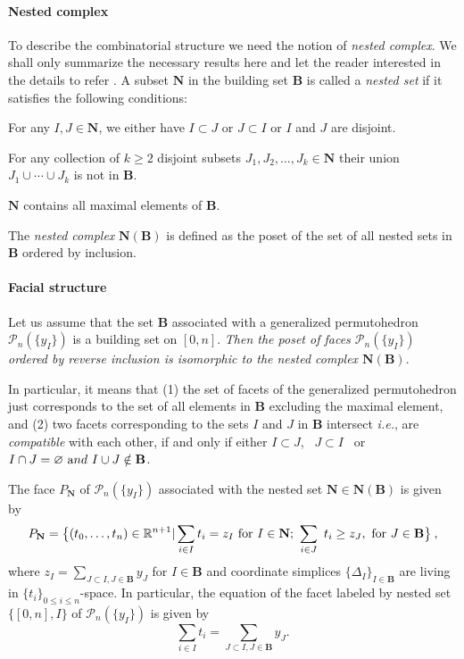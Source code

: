 \documentclass[hidelinks,12pt]{article}
\newcommand{\bea}[1]{\begin{eqnarray}\label{#1} }
\newcommand{\eea}{\end{eqnarray}}
\def\bea{\begin{eqnarray}}
\def\eea{\end{eqnarray}}
\begin{document}
\paragraph{Nested complex} To describe the combinatorial structure we need the notion of {\it nested complex}. We shall only summarize the necessary results here and let the reader interested in the details to refer \cite{Postnikov:2005,Postnikov:2006}.
A subset ${\mathbf N}$ in the building set ${\mathbf B}$ is called a {\it nested set} if it satisfies the following conditions:
\begin{compactenum}[\quad (1)]
    \item For any $I,J \in {\mathbf N}$, we either have $I \subset J$ or $J\subset I$ or $I$ and $J$ are disjoint.
    \item For any collection of $k \geq 2$ disjoint subsets $J_1,J_2,\dots, J_k \in \mathbf N$ their union $J_1 \cup \cdots \cup J_k$ is not in $\mathbf B$.
    \item ${\mathbf N}$ contains all maximal elements of $\mathbf B$.
\end{compactenum}
The {\it nested complex} ${\mathbf N}({\mathbf B})$ is defined as the poset of the set of all nested sets in ${\mathbf B}$ ordered by inclusion.
\paragraph*{Facial structure} 
Let us assume that the set ${\mathbf B}$ associated with a generalized permutohedron ${\mathscr P_n(\{y_I\})}$ is a building set on $[0,n]$. \emph{Then the poset of faces ${\mathscr P_n(\{y_I\})}$ ordered by reverse inclusion is isomorphic to the nested complex ${\mathbf N}({\mathbf B})$}. 

In particular, it means that (1) the set of facets of the generalized permutohedron just corresponds to the set of all elements in ${\mathbf B}$ excluding the maximal element, and (2) two facets corresponding to the sets $I$ and $J$ in ${\mathbf B}$ intersect {\it i.e.}, are {\it compatible} with each other, if and only if  either $I \subset J$,~ $J \subset I$~ or $I \cap J = \varnothing ~{\text and} ~ I \cup J \notin {\mathbf B}$.

The face $P_\mathbf{N}$ of ${\mathscr P_n(\{y_I\})}$ associated with the nested set $\mathbf{N} \in \mathbf{N}(\mathbf{B})$ is given by
\bea\label{deffacet}
P_{\mathbf{N}} = \bigl\{ (t_0,\dots,t_{n}) \in \mathbb{R}^{n+1} | \sum_{i \in I} t_i =z_{I}~{\rm for}~I \in \mathbf{N}; ~ \sum_{i \in J}~t_i \geq z_J,~ {\rm for} ~J \in \mathbf{B}  \bigr\} \:,
\eea
where $z_I=\sum_{J\subset I,J\in\mathbf B}y_J$ for $I\in \mathbf B$ and coordinate simplices $\{\Delta_I\}_{I\in\mathbf B}$ are living in $\{t_i\}_{0\leq i\leq n}$-space.
In particular, the equation of the facet labeled by nested set $\{[0,n],I\}$ of ${\mathscr P_n(\{y_I\})}$ is given by
\begin{equation}\label{eqoffacet}
\sum_{i\in I}t_i=\sum_{J\subset I,J\in\mathbf B}y_J.
\end{equation}
\end{document}
